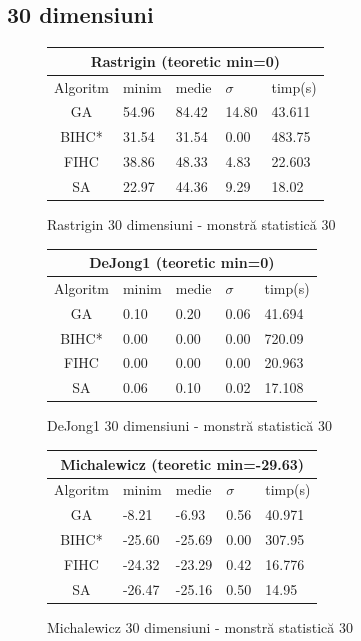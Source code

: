 \documentclass{article}
\begin{document}
\clearpage
\subsection{30 dimensiuni}


\begin{figure}[!h]
\begin{tabular}{||c|||l|l|l|l||}
  \hline
  \multicolumn{5}{||c||}{Rastrigin (teoretic min=0)} \\ \hline
  Algoritm & minim & medie & $\sigma$ & timp(s) \\ \hline \hline
  GA & 54.96 & 84.42 & 14.80 & 43.611 \\ \hline
  BIHC* & 31.54 & 31.54 & 0.00 & 483.75\\ \hline
  FIHC & 38.86 & 48.33 & 4.83 & 22.603 \\ \hline
  SA & 22.97 & 44.36 & 9.29 & 18.02 \\ \hline
\end{tabular}
\caption{Rastrigin 30 dimensiuni - monstră statistică 30} 
\end{figure}

\begin{figure}[!h]
\begin{tabular}{||c|||l|l|l|l||}
  \hline
  \multicolumn{5}{||c||}{DeJong1 (teoretic min=0)} \\ \hline
  Algoritm & minim & medie & $\sigma$ & timp(s) \\ \hline \hline
  GA & 0.10 & 0.20 & 0.06 & 41.694 \\ \hline
  BIHC* & 0.00 & 0.00 & 0.00 & 720.09\\ \hline
  FIHC & 0.00 & 0.00 & 0.00 & 20.963 \\ \hline
  SA & 0.06 & 0.10 & 0.02 & 17.108 \\ \hline
\end{tabular}
\caption{DeJong1 30 dimensiuni - monstră statistică 30} 
\end{figure}

\begin{figure}[!h]
\begin{tabular}{||c|||l|l|l|l||}
  \hline
  \multicolumn{5}{||c||}{Michalewicz (teoretic min=-29.63)} \\ \hline
  Algoritm & minim & medie & $\sigma$ & timp(s) \\ \hline \hline
  GA & -8.21 & -6.93 & 0.56 & 40.971 \\ \hline
  BIHC* & -25.60 & -25.69 & 0.00 & 307.95\\ \hline
  FIHC & -24.32 & -23.29 & 0.42 & 16.776 \\ \hline
  SA & -26.47 & -25.16 & 0.50 & 14.95 \\ \hline
\end{tabular}
\caption{Michalewicz 30 dimensiuni - monstră statistică 30} 
\end{figure}
\end{document}
